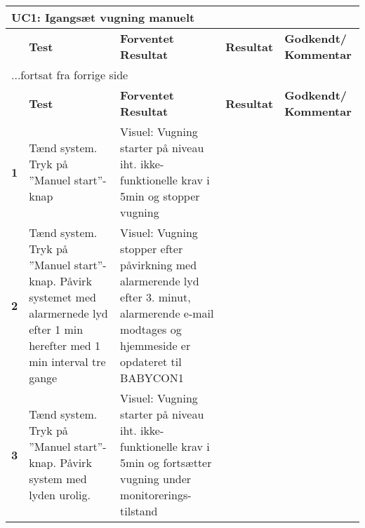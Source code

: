 \begin{center}
	\label{accepttest:uc1} 
\begin{longtable}{|p{}|p{}|p{}|p{}|p{}|} %
\hline
\multicolumn{5}{|l|}{\textbf{UC1: Igangsæt vugning manuelt}} \\ \hline
\multicolumn{1}{|c|}{} &
\textbf{Test} &
\textbf{Forventet \newline Resultat} &
\textbf{Resultat} &
\textbf{Godkendt/ \newline Kommentar} \\ \hline 
\endfirsthead

\multicolumn{5}{l}{...fortsat fra forrige side} \\ \hline 
\multicolumn{1}{|c|}{} &
\textbf{Test} &
\textbf{Forventet \newline Resultat} &
\textbf{Resultat} &
\textbf{Godkendt/ \newline Kommentar} \\ \hline 
\endhead



\textbf{1}	&Tænd system. Tryk på ''Manuel start''-knap
			&Visuel: Vugning starter på niveau iht. ikke-funktionelle krav i 5min og stopper vugning
			&
			&
			\\\hline

\textbf{2}	&Tænd system. Tryk på ''Manuel start''-knap. Påvirk systemet med alarmernede lyd efter 1 min herefter med 1 min interval tre gange
			&Visuel: Vugning stopper efter påvirkning med alarmerende lyd efter 3. minut, 
			 alarmerende e-mail modtages og hjemmeside er opdateret til BABYCON1
			&
			&
			\\\hline
			 
\textbf{3}	&Tænd system. Tryk på ''Manuel start''-knap. Påvirk system med lyden urolig.
			&Visuel: Vugning starter på niveau iht. ikke-funktionelle krav i 5min og fortsætter vugning under monitorerings-tilstand
			&
			&
			\\\hline

\end{longtable}
\end{center}